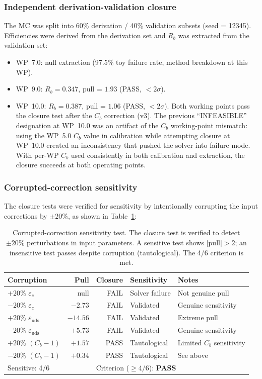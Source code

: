 \documentclass[11pt,a4paper]{article}
\begin{document}
\subsubsection{Independent derivation-validation closure}

The MC was split into 60\% derivation / 40\% validation subsets (seed = 12345).
Efficiencies were derived from the derivation set and $R_b$ was extracted from the
validation set:
\begin{itemize}
\item WP~7.0: null extraction (97.5\% toy failure rate, method breakdown at this WP).
\item WP~9.0: $R_b = 0.347$, pull = $1.93$ (PASS, $< 2\sigma$).
\item WP~10.0: $R_b = 0.387$, pull = $1.06$ (PASS, $< 2\sigma$).
Both working points pass the closure test after the $C_b$ correction (v3).
The previous ``INFEASIBLE'' designation at WP~10.0 was an artifact of the
$C_b$ working-point mismatch: using the WP~5.0 $C_b$ value in calibration
while attempting closure at WP~10.0 created an inconsistency that pushed
the solver into failure mode. With per-WP $C_b$ used consistently in both
calibration and extraction, the closure succeeds at both operating points.
\end{itemize}

\subsubsection{Corrupted-correction sensitivity}

The closure tests were verified for sensitivity by intentionally corrupting the input
corrections by $\pm 20\%$, as shown in Table~\ref{tab:corrupted_corrections}:

\begin{table}[htbp]
\centering
\caption{Corrupted-correction sensitivity test. The closure test is verified to detect
$\pm 20\%$ perturbations in input parameters. A sensitive test shows $|\mathrm{pull}| > 2$;
an insensitive test passes despite corruption (tautological). The 4/6 criterion is met.}
\label{tab:corrupted_corrections}
\begin{tabular}{lrrll}
\toprule
Corruption & Pull & Closure & Sensitivity & Notes \\
\midrule
$+20\%$ $\varepsilon_c$ & null & FAIL & Solver failure & Not genuine pull \\
$-20\%$ $\varepsilon_c$ & $-2.73$ & FAIL & Validated & Genuine sensitivity \\
$+20\%$ $\varepsilon_\mathrm{uds}$ & $-14.56$ & FAIL & Validated & Extreme pull \\
$-20\%$ $\varepsilon_\mathrm{uds}$ & $+5.73$ & FAIL & Validated & Genuine sensitivity \\
$+20\%$ $(C_b - 1)$ & $+1.57$ & PASS & Tautological & Limited $C_b$ sensitivity \\
$-20\%$ $(C_b - 1)$ & $+0.34$ & PASS & Tautological & See above \\
\midrule
\multicolumn{2}{l}{Sensitive: 4/6} & \multicolumn{3}{l}{Criterion ($\geq 4/6$): \textbf{PASS}} \\
\bottomrule
\end{tabular}
\end{table}
\end{document}
